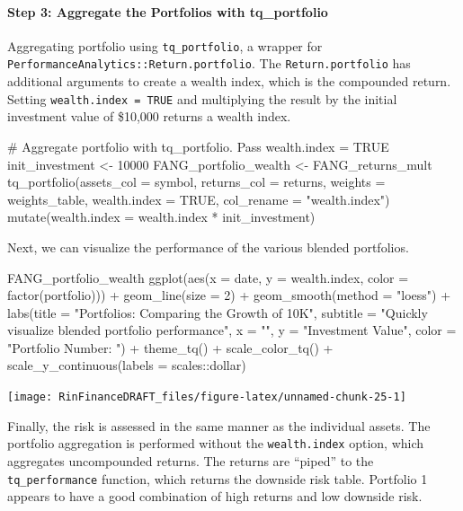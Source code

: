 \paragraph{Step 3: Aggregate the Portfolios with
tq\_portfolio}\label{step-3-aggregate-the-portfolios-with-tq_portfolio}

Aggregating portfolio using \texttt{tq\_portfolio}, a wrapper for
\texttt{PerformanceAnalytics::Return.portfolio}. The
\texttt{Return.portfolio} has additional arguments to create a wealth
index, which is the compounded return. Setting
\texttt{wealth.index\ =\ TRUE} and multiplying the result by the initial
investment value of \$10,000 returns a wealth index.

\begin{Schunk}
\begin{Sinput}
# Aggregate portfolio with tq_portfolio. Pass wealth.index = TRUE
init_investment <- 10000
FANG_portfolio_wealth <- FANG_returns_mult %
    tq_portfolio(assets_col = symbol, returns_col = returns,
                 weights = weights_table, wealth.index = TRUE,
                 col_rename = "wealth.index") %
    mutate(wealth.index = wealth.index * init_investment)
\end{Sinput}
\end{Schunk}

Next, we can visualize the performance of the various blended
portfolios.

\begin{Schunk}
\begin{Sinput}
FANG_portfolio_wealth  %
    ggplot(aes(x = date, y = wealth.index, color = factor(portfolio))) +
    geom_line(size = 2) +
    geom_smooth(method = "loess") +
    labs(title = "Portfolios: Comparing the Growth of 10K",
         subtitle = "Quickly visualize blended portfolio performance",
         x = "", y = "Investment Value",
         color = "Portfolio Number: ") +
    theme_tq() +
    scale_color_tq() +
    scale_y_continuous(labels = scales::dollar)
\end{Sinput}


\begin{center}\texttt{[image: RinFinanceDRAFT\_files/figure-latex/unnamed-chunk-25-1]} \end{center}

\end{Schunk}

Finally, the risk is assessed in the same manner as the individual
assets. The portfolio aggregation is performed without the
\texttt{wealth.index} option, which aggregates uncompounded returns. The
returns are ``piped'' to the \texttt{tq\_performance} function, which
returns the downside risk table. Portfolio 1 appears to have a good
combination of high returns and low downside risk.


